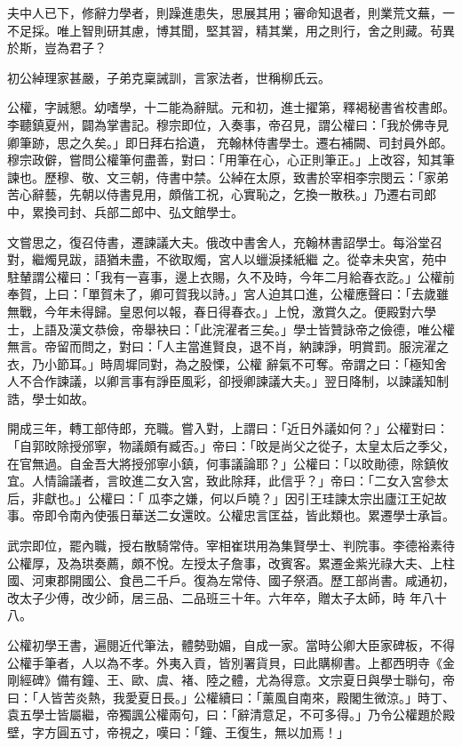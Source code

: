 \begin{pinyinscope}
 夫中人已下，修辭力學者，則躁進患失，思展其用；審命知退者，則業荒文蕪，一不足採。唯上智則研其慮，博其聞，堅其習，精其業，用之則行，舍之則藏。茍異於斯，豈為君子？



 初公綽理家甚嚴，子弟克稟誡訓，言家法者，世稱柳氏云。



 公權，字誠懇。幼嗜學，十二能為辭賦。元和初，進士擢第，釋褐秘書省校書郎。李聽鎮夏州，闢為掌書記。穆宗即位，入奏事，帝召見，謂公權曰：「我於佛寺見卿筆跡，思之久矣。」即日拜右拾遺，
 充翰林侍書學士。遷右補闕、司封員外郎。穆宗政僻，嘗問公權筆何盡善，對曰：「用筆在心，心正則筆正。」上改容，知其筆諫也。歷穆、敬、文三朝，侍書中禁。公綽在太原，致書於宰相李宗閔云：「家弟苦心辭藝，先朝以侍書見用，頗偕工祝，心實恥之，乞換一散秩。」乃遷右司郎中，累換司封、兵部二郎中、弘文館學士。



 文嘗思之，復召侍書，遷諫議大夫。俄改中書舍人，充翰林書詔學士。每浴堂召對，繼燭見跋，語猶未盡，不欲取燭，宮人以蠟淚揉紙繼
 之。從幸未央宮，苑中駐輦謂公權曰：「我有一喜事，邊上衣賜，久不及時，今年二月給春衣訖。」公權前奉賀，上曰：「單賀未了，卿可賀我以詩。」宮人迫其口進，公權應聲曰：「去歲雖無戰，今年未得歸。皇恩何以報，春日得春衣。」上悅，激賞久之。便殿對六學士，上語及漢文恭儉，帝舉袂曰：「此浣濯者三矣。」學士皆贊詠帝之儉德，唯公權無言。帝留而問之，對曰：「人主當進賢良，退不肖，納諫諍，明賞罰。服浣濯之衣，乃小節耳。」時周墀同對，為之股慄，公權
 辭氣不可奪。帝謂之曰：「極知舍人不合作諫議，以卿言事有諍臣風彩，卻授卿諫議大夫。」翌日降制，以諫議知制誥，學士如故。



 開成三年，轉工部侍郎，充職。嘗入對，上謂曰：「近日外議如何？」公權對曰：「自郭旼除授邠寧，物議頗有臧否。」帝曰：「旼是尚父之從子，太皇太后之季父，在官無過。自金吾大將授邠寧小鎮，何事議論耶？」公權曰：「以旼勛德，除鎮攸宜。人情論議者，言旼進二女入宮，致此除拜，此信乎？」帝曰：「二女入宮參太后，非獻也。」公權曰：「
 瓜李之嫌，何以戶曉？」因引王珪諫太宗出廬江王妃故事。帝即令南內使張日華送二女還旼。公權忠言匡益，皆此類也。累遷學士承旨。



 武宗即位，罷內職，授右散騎常侍。宰相崔珙用為集賢學士、判院事。李德裕素待公權厚，及為珙奏薦，頗不悅。左授太子詹事，改賓客。累遷金紫光祿大夫、上柱國、河東郡開國公、食邑二千戶。復為左常侍、國子祭酒。歷工部尚書。咸通初，改太子少傅，改少師，居三品、二品班三十年。六年卒，贈太子太師，時
 年八十八。



 公權初學王書，遍閱近代筆法，體勢勁媚，自成一家。當時公卿大臣家碑板，不得公權手筆者，人以為不孝。外夷入貢，皆別署貨貝，曰此購柳書。上都西明寺《金剛經碑》備有鐘、王、歐、虞、褚、陸之體，尤為得意。文宗夏日與學士聯句，帝曰：「人皆苦炎熱，我愛夏日長。」公權續曰：「薰風自南來，殿閣生微涼。」時丁、袁五學士皆屬繼，帝獨諷公權兩句，曰：「辭清意足，不可多得。」乃令公權題於殿壁，字方圓五寸，帝視之，嘆曰：「鐘、王復生，無以加焉！」




\end{pinyinscope}
